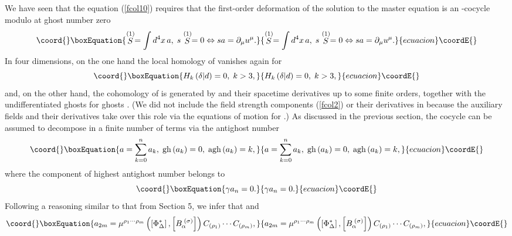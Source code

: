 \documentclass[a4paper,12pt]{article}
\begin{document}
We have seen that the equation (\ref{fcol10}) requires that the first-order
deformation of the solution to the master equation is an \coordHE{}-cocycle modulo \coordHE{} at ghost number zero 
\begin{equation}\coord{}\boxEquation{
\stackrel{(1)}{S}=\int d^{4}x\,a,\;s\stackrel{(1)}{S}=0\Leftrightarrow
sa=\partial _{\mu }u^{\mu }.  \label{fcola19}
}{
\stackrel{(1)}{S}=\int d^{4}x\,a,\;s\stackrel{(1)}{S}=0\Leftrightarrow
sa=\partial _{\mu }u^{\mu }.  }{ecuacion}\coordE{}\end{equation}
In four dimensions, on the one hand the local homology of \myHighlight{$\delta $}\coordHE{} vanishes
again for \coordHE{} \cite{20and5} 
\begin{equation}\coord{}\boxEquation{
H_{k}\left( \delta |d\right) =0,\;k>3,  \label{fcola19a}
}{
H_{k}\left( \delta |d\right) =0,\;k>3,  }{ecuacion}\coordE{}\end{equation}
and, on the other hand, the cohomology of \myHighlight{$\gamma $}\coordHE{} is generated by \coordHE{} and their spacetime
derivatives up to some finite orders, together with the undifferentiated
ghosts for ghosts \coordHE{}. (We did not include the field strength
components (\ref{fcol2}) or their derivatives in \coordHE{}
because the auxiliary fields and their derivatives take over this role via
the equations of motion for \coordHE{}.) As discussed in
the previous section, the cocycle \coordHE{} can be assumed to decompose in a
finite number of terms via the antighost number 
\begin{equation}\coord{}\boxEquation{
a=\sum_{k=0}^{n}a_{k},\;\mathrm{gh}\left( a_{k}\right) =0,\;\mathrm{agh}
\left( a_{k}\right) =k,  \label{fcola20}
}{
a=\sum_{k=0}^{n}a_{k},\;\mathrm{gh}\left( a_{k}\right) =0,\;\mathrm{agh}
\left( a_{k}\right) =k,  }{ecuacion}\coordE{}\end{equation}
where the component of highest antighost number belongs to \coordHE{} 
\begin{equation}\coord{}\boxEquation{
\gamma a_{n}=0.  \label{fcola21}
}{
\gamma a_{n}=0.  }{ecuacion}\coordE{}\end{equation}
Following a reasoning similar to that from Section 5, we infer that \coordHE{}
and 
\begin{equation}\coord{}\boxEquation{
a_{2m}=\mu ^{\rho _{1}\cdots \rho _{m}}\left( \left[ \Phi _{\Delta
}^{*}\right] ,\left[ B_{\alpha }^{\;(\sigma )}\right] \right) C_{(\rho
_{1})}\cdots C_{(\rho _{m})},  \label{fcola23}
}{
a_{2m}=\mu ^{\rho _{1}\cdots \rho _{m}}\left( \left[ \Phi _{\Delta
}^{*}\right] ,\left[ B_{\alpha }^{\;(\sigma )}\right] \right) C_{(\rho
_{1})}\cdots C_{(\rho _{m})},  }{ecuacion}\coordE{}\end{equation}
\end{document}
